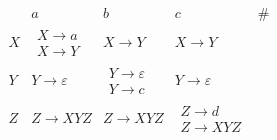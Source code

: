 \documentclass[dvipdfmx]{jarticle}
\begin{document}
\[
\begin{array}{c|cccc}
  & a & b & c & \#\\\hline
X & \begin{array}{c}X\rightarrow a\\X\rightarrow Y\end{array} & X\rightarrow Y & X\rightarrow Y & \\
Y & Y\rightarrow\varepsilon & \begin{array}{c}Y\rightarrow\varepsilon\\Y\rightarrow c\end{array} & Y\rightarrow\varepsilon & \\
Z & Z\rightarrow XYZ & Z\rightarrow XYZ & \begin{array}{c}Z\rightarrow d\\Z\rightarrow XYZ\end{array} & \\
\end{array}
\]
\end{document}
